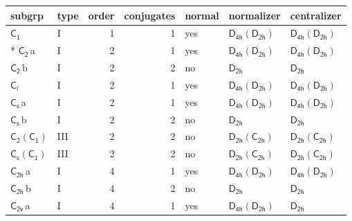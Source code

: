 \documentclass[10pt,a4paper]{article}
\numberwithin{equation}{section}
\newcommand{\grp}[1]{\mathsf{#1}}
\newcommand{\clsletter}[1]{\,{\scriptsize\color{black!55}#1}}
\begin{document}
{\small\begin{longtable}{@{}llrrlll@{}}\toprule
subgrp & type & order & conjugates & normal & normalizer & centralizer\\\midrule\endhead
\bottomrule\endfoot\endlastfoot
\href{../../../rotation/data/pdf/C1.pdf}{$\grp{C_{1}}$} & I & 1 & 1 & yes & \href{D4h-D2h.pdf}{$\grp{D_{4h}}(\grp{D_{2h}})$} & \href{D4h-D2h.pdf}{$\grp{D_{4h}}(\grp{D_{2h}})$}\\*
\href{../../../rotation/data/pdf/C2.pdf}{$\grp{C_{2}}$}\clsletter{a} & I & 2 & 1 & yes & \href{D4h-D2h.pdf}{$\grp{D_{4h}}(\grp{D_{2h}})$} & \href{D4h-D2h.pdf}{$\grp{D_{4h}}(\grp{D_{2h}})$}\\
\href{../../../rotation/data/pdf/C2.pdf}{$\grp{C_{2}}$}\clsletter{b} & I & 2 & 2 & no & \href{../../../rotation/data/pdf/D2h.pdf}{$\grp{D_{2h}}$} & \href{../../../rotation/data/pdf/D2h.pdf}{$\grp{D_{2h}}$}\\
\href{../../../rotation/data/pdf/S2.pdf}{$\grp{C_{i}}$} & I & 2 & 1 & yes & \href{D4h-D2h.pdf}{$\grp{D_{4h}}(\grp{D_{2h}})$} & \href{D4h-D2h.pdf}{$\grp{D_{4h}}(\grp{D_{2h}})$}\\
\href{../../../rotation/data/pdf/C1v.pdf}{$\grp{C_{s}}$}\clsletter{a} & I & 2 & 1 & yes & \href{D4h-D2h.pdf}{$\grp{D_{4h}}(\grp{D_{2h}})$} & \href{D4h-D2h.pdf}{$\grp{D_{4h}}(\grp{D_{2h}})$}\\
\href{../../../rotation/data/pdf/C1v.pdf}{$\grp{C_{s}}$}\clsletter{b} & I & 2 & 2 & no & \href{../../../rotation/data/pdf/D2h.pdf}{$\grp{D_{2h}}$} & \href{../../../rotation/data/pdf/D2h.pdf}{$\grp{D_{2h}}$}\\
\href{C2-C1.pdf}{$\grp{C_{2}}(\grp{C_{1}})$} & III & 2 & 2 & no & \href{D2h-C2h.pdf}{$\grp{D_{2h}}(\grp{C_{2h}})$} & \href{D2h-C2h.pdf}{$\grp{D_{2h}}(\grp{C_{2h}})$}\\
\href{C1v-C1.pdf}{$\grp{C_{s}}(\grp{C_{1}})$} & III & 2 & 2 & no & \href{D2h-C2h.pdf}{$\grp{D_{2h}}(\grp{C_{2h}})$} & \href{D2h-C2h.pdf}{$\grp{D_{2h}}(\grp{C_{2h}})$}\\
\href{../../../rotation/data/pdf/C2h.pdf}{$\grp{C_{2h}}$}\clsletter{a} & I & 4 & 1 & yes & \href{D4h-D2h.pdf}{$\grp{D_{4h}}(\grp{D_{2h}})$} & \href{D4h-D2h.pdf}{$\grp{D_{4h}}(\grp{D_{2h}})$}\\
\href{../../../rotation/data/pdf/C2h.pdf}{$\grp{C_{2h}}$}\clsletter{b} & I & 4 & 2 & no & \href{../../../rotation/data/pdf/D2h.pdf}{$\grp{D_{2h}}$} & \href{../../../rotation/data/pdf/D2h.pdf}{$\grp{D_{2h}}$}\\
\href{../../../rotation/data/pdf/C2v.pdf}{$\grp{C_{2v}}$}\clsletter{a} & I & 4 & 1 & yes & \href{D4h-D2h.pdf}{$\grp{D_{4h}}(\grp{D_{2h}})$} & \href{../../../rotation/data/pdf/D2h.pdf}{$\grp{D_{2h}}$}\\

\end{longtable}}
\end{document}
